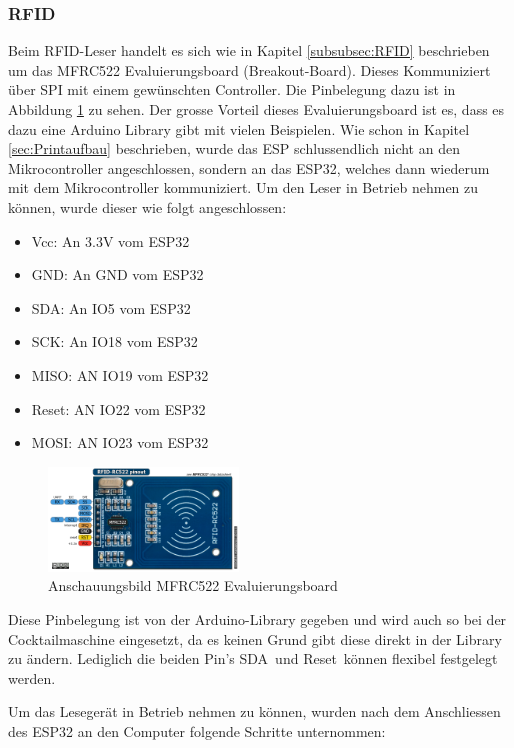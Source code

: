 \subsubsection{RFID}
\label{subsubsec:Inbetriebnahme_RFID}

Beim RFID-Leser handelt es sich wie in Kapitel \ref{subsubsec:RFID} beschrieben um das MFRC522 Evaluierungsboard (Breakout-Board). Dieses Kommuniziert über SPI mit einem gewünschten Controller. Die Pinbelegung dazu ist in Abbildung \ref{fig:MFRC522} zu sehen. Der grosse Vorteil dieses Evaluierungsboard ist es, dass es dazu eine Arduino Library gibt mit vielen Beispielen. Wie schon in Kapitel \ref{sec:Printaufbau} beschrieben, wurde das ESP schlussendlich nicht an den Mikrocontroller angeschlossen, sondern an das ESP32, welches dann wiederum mit dem Mikrocontroller kommuniziert. Um den Leser in Betrieb nehmen zu können, wurde dieser wie folgt angeschlossen:


\begin{itemize}
\item Vcc: An 3.3V vom ESP32
\item GND: An GND vom ESP32
\item SDA: An IO5 vom ESP32
\item SCK: An IO18 vom ESP32
\item MISO: AN IO19 vom ESP32
\item Reset: AN IO22 vom ESP32
\item MOSI: AN IO23 vom ESP32
\end{itemize}

\begin{figure}[h!]
\center
\includegraphics[width = 0.45\textwidth]{graphics/MFRC522}
\caption{Anschauungsbild MFRC522 Evaluierungsboard \cite{nxp_bv_2010_antenna_2010}}
\label{fig:MFRC522}
\end{figure}

Diese Pinbelegung ist von der Arduino-Library gegeben und wird auch so bei der Cocktailmaschine eingesetzt, da es keinen Grund gibt diese direkt in der Library zu ändern. Lediglich die beiden Pin's \flqq SDA\frqq~und \flqq Reset\frqq~können flexibel festgelegt werden.

Um das Lesegerät in Betrieb nehmen zu können, wurden nach dem Anschliessen des ESP32 an den Computer folgende Schritte unternommen: 

